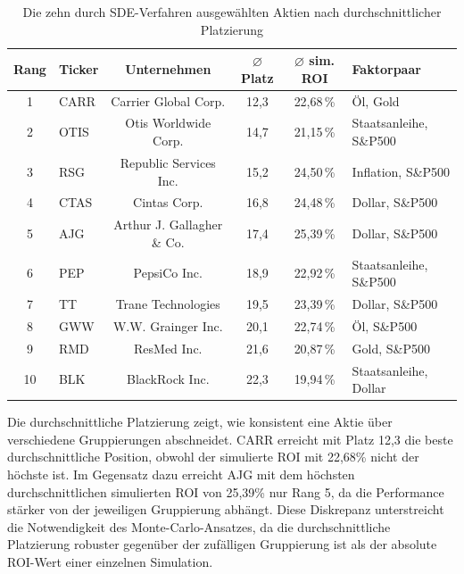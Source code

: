 \begin{table}[htbp]
    \centering
    \footnotesize
    \begin{tabular}{c l c c c l}
        \toprule
        Rang & Ticker & Unternehmen                & $\varnothing$ Platz & $\varnothing$ sim. ROI & Faktorpaar             \\
        \midrule
        1    & CARR   & Carrier Global Corp.       & 12,3                & 22,68\,\%              & Öl, Gold               \\
        2    & OTIS   & Otis Worldwide Corp.       & 14,7                & 21,15\,\%              & Staatsanleihe, S\&P500 \\
        3    & RSG    & Republic Services Inc.     & 15,2                & 24,50\,\%              & Inflation, S\&P500     \\
        4    & CTAS   & Cintas Corp.               & 16,8                & 24,48\,\%              & Dollar, S\&P500        \\
        5    & AJG    & Arthur J. Gallagher \& Co. & 17,4                & 25,39\,\%              & Dollar, S\&P500        \\
        6    & PEP    & PepsiCo Inc.               & 18,9                & 22,92\,\%              & Staatsanleihe, S\&P500 \\
        7    & TT     & Trane Technologies         & 19,5                & 23,39\,\%              & Dollar, S\&P500        \\
        8    & GWW    & W.W. Grainger Inc.         & 20,1                & 22,74\,\%              & Öl, S\&P500            \\
        9    & RMD    & ResMed Inc.                & 21,6                & 20,87\,\%              & Gold, S\&P500          \\
        10   & BLK    & BlackRock Inc.             & 22,3                & 19,94\,\%              & Staatsanleihe, Dollar  \\
        \bottomrule
    \end{tabular}
    \caption{Die zehn durch SDE-Verfahren ausgewählten Aktien nach durchschnittlicher Platzierung}\label{tab:selected_stocks}
\end{table}

Die durchschnittliche Platzierung zeigt, wie konsistent eine Aktie über verschiedene Gruppierungen abschneidet. CARR erreicht mit Platz 12,3 die beste durchschnittliche Position, obwohl der simulierte \ac{ROI} mit 22,68\% nicht der höchste ist. Im Gegensatz dazu erreicht AJG mit dem höchsten durchschnittlichen simulierten \ac{ROI} von 25,39\% nur Rang 5, da die Performance stärker von der jeweiligen Gruppierung abhängt. Diese Diskrepanz unterstreicht die Notwendigkeit des Monte-Carlo-Ansatzes, da die durchschnittliche Platzierung robuster gegenüber der zufälligen Gruppierung ist als der absolute \ac{ROI}-Wert einer einzelnen Simulation.

